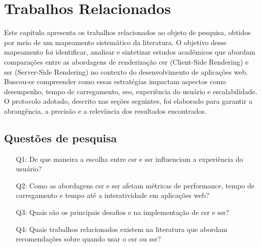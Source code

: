 \chapter{Trabalhos Relacionados}
\label{cap:trabalhos}
Este capítulo apresenta os trabalhos relacionados ao objeto de pesquisa, obtidos por meio de um mapeamento sistemático da literatura. O objetivo desse mapeamento foi identificar, analisar e sintetizar estudos acadêmicos que abordam comparações entre as abordagens de renderização \acrshort{csr} (Client-Side Rendering) e \acrshort{ssr} (Server-Side Rendering) no contexto do desenvolvimento de aplicações web. Buscou-se compreender como essas estratégias impactam aspectos como desempenho, tempo de carregamento, \acrshort{seo}, experiência do usuário e escalabilidade. O protocolo adotado, descrito nas seções seguintes, foi elaborado para garantir a abrangência, a precisão e a relevância dos resultados encontrados.


\section{Questões de pesquisa}
\label{section:questoes_pesquisa}
\begin{enumerate}
    \item[Q1:] De que maneira a escolha entre \acrshort{csr} e \acrshort{ssr} influenciam a experiência do usuário?
    \item[Q2:] Como as abordagens \acrshort{csr} e \acrshort{ssr} afetam métricas de performance, tempo de carregamento e tempo até a interatividade em aplicações web?
    \item[Q3:] Quais são os principais desafios e  na implementação de \acrshort{csr} e \acrshort{ssr}?
    \item[Q4:] Quais trabalhos relacionados existem na literatura que abordam recomendações sobre quando usar o \acrshort{csr} ou \acrshort{ssr}?

\end{enumerate}


